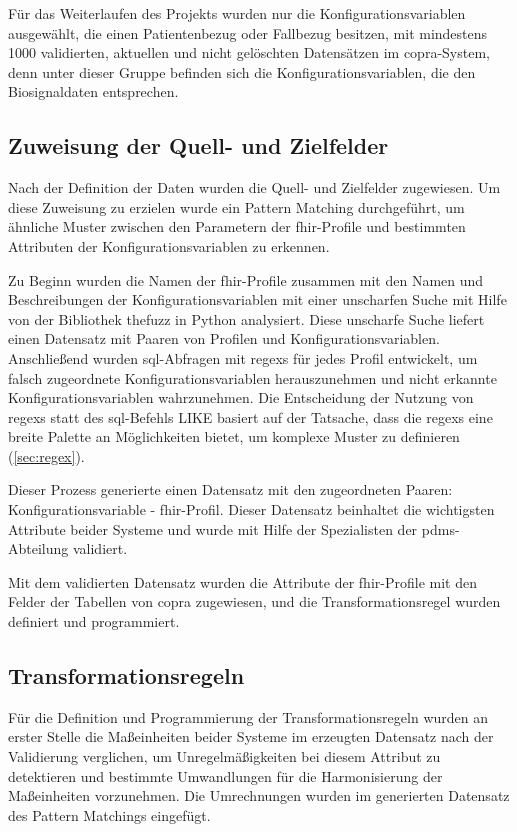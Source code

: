 Für das Weiterlaufen des Projekts wurden nur die Konfigurationsvariablen ausgewählt, die einen Patientenbezug oder Fallbezug besitzen, mit mindestens 1000 validierten, aktuellen und nicht gelöschten Datensätzen im \ac{copra}-System, denn unter dieser Gruppe befinden sich die Konfigurationsvariablen, die den Biosignaldaten entsprechen.

\subsection{Zuweisung der Quell- und Zielfelder} \label{sec:patternmatchingicucopra}

Nach der Definition der Daten wurden die Quell- und Zielfelder zugewiesen. Um diese Zuweisung zu erzielen wurde ein Pattern Matching durchgeführt, um ähnliche Muster zwischen den Parametern der \ac{fhir}-Profile und bestimmten Attributen der Konfigurationsvariablen zu erkennen. 

Zu Beginn wurden die Namen der \ac{fhir}-Profile zusammen mit den Namen und Beschreibungen der Konfigurationsvariablen mit einer unscharfen Suche mit Hilfe von der Bibliothek \glqq thefuzz\grqq{} in Python analysiert. Diese unscharfe Suche liefert einen Datensatz mit Paaren von Profilen und Konfigurationsvariablen. Anschließend wurden \ac{sql}-Abfragen mit \acp{regex} für jedes Profil entwickelt, um falsch zugeordnete Konfigurationsvariablen herauszunehmen und nicht erkannte Konfigurationsvariablen wahrzunehmen. Die Entscheidung der Nutzung von \acp{regex} statt des \ac{sql}-Befehls \glqq LIKE\grqq{} basiert auf der Tatsache, dass die \acp{regex} eine breite Palette an Möglichkeiten bietet, um komplexe Muster zu definieren (\ref{sec:regex}).

Dieser Prozess generierte einen Datensatz mit den zugeordneten Paaren: Konfigurationsvariable - \ac{fhir}-Profil. Dieser Datensatz beinhaltet die wichtigsten Attribute beider Systeme und wurde mit Hilfe der Spezialisten der \ac{pdms}-Abteilung validiert.

Mit dem validierten Datensatz wurden die Attribute der \ac{fhir}-Profile mit den Felder der Tabellen von \ac{copra} zugewiesen, und die Transformationsregel wurden definiert und programmiert.

\subsection{Transformationsregeln} \label{sec:transformrules}

Für die Definition und Programmierung der Transformationsregeln wurden an erster Stelle die Maßeinheiten beider Systeme im erzeugten Datensatz nach der Validierung verglichen, um Unregelmäßigkeiten bei diesem Attribut zu detektieren und bestimmte Umwandlungen für die Harmonisierung der Maßeinheiten vorzunehmen. Die Umrechnungen wurden im generierten Datensatz des Pattern Matchings eingefügt.


